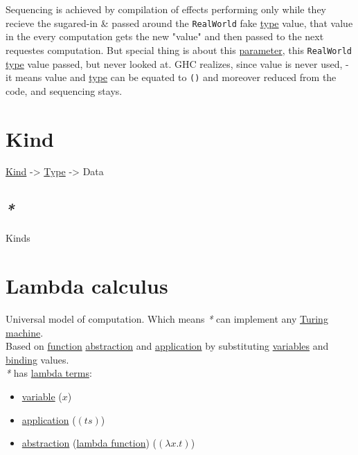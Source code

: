 \documentclass[a4paper,14pt,oneside]{book}
\begin{document}
Sequencing is achieved by compilation of effects performing only while they recieve the sugared-in \& passed around the \texttt{RealWorld} fake \hyperref[org35b9249]{type} value, that value in the every computation gets the new "value" and then passed to the next requestes computation. But special thing is about this \hyperref[orgd362766]{parameter}, this \texttt{RealWorld} \hyperref[org35b9249]{type} value passed, but never looked at. GHC realizes, since value is never used, - it means value and \hyperref[org35b9249]{type} can be equated to \texttt{()} and moreover reduced from the code, and sequencing stays.\\

\chapter{\label{org4c84b44}Kind}
\label{sec:org0dd1e26}
\hyperref[org4c84b44]{Kind} -> \hyperref[org35b9249]{Type} -> Data\\

\section{\emph{*}}
\label{sec:orgaafba45}

\label{org7010d09}Kinds\\

\chapter{\label{org1fa2ea8}Lambda calculus}
\label{sec:orgc2c575a}
Universal model of computation. Which means \emph{*} can implement any \hyperref[org81c6fd8]{Turing machine}.\\
Based on \hyperref[org9530a6b]{function} \hyperref[org5f0f6fc]{abstraction} and \hyperref[orgf3301f1]{application} by substituting \hyperref[org0f938c0]{variables} and \hyperref[orgf4d58db]{binding} values.\\

\emph{*} has \hyperref[orgf847de2]{lambda terms}:\\
\begin{itemize}
\item \hyperref[org2a8e721]{variable} (\(x\))\\
\item \hyperref[orgf3301f1]{application} (\((ts)\))\\
\item \hyperref[org5f0f6fc]{abstraction} (\hyperref[org9bf1ac3]{lambda function}) (\((\lambda x . t)\))\\
\end{itemize}
\end{document}
